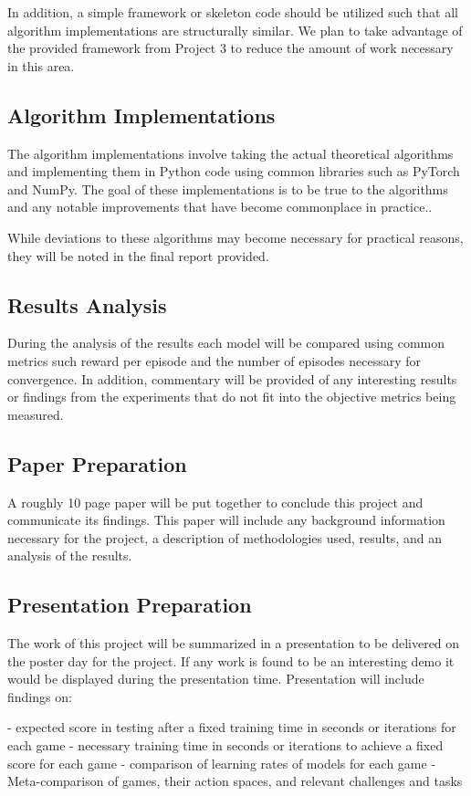 \documentclass[conference]{IEEEtran}
\begin{document}
In addition, a simple framework or skeleton code should be utilized such that all algorithm implementations are structurally similar.
We plan to take advantage of the provided framework from Project 3 to reduce the amount of work necessary in this area.

\subsection{Algorithm Implementations}
The algorithm implementations involve taking the actual theoretical algorithms and implementing them in Python code using common libraries such as PyTorch and NumPy.
The goal of these implementations is to be true to the algorithms and any notable improvements that have become commonplace in practice..

While deviations to these algorithms may become necessary for practical reasons, they will be noted in the final report provided.

\subsection{Results Analysis}
During the analysis of the results each model will be compared using common metrics such reward per episode and the number of episodes necessary for convergence.
In addition, commentary will be provided of any interesting results or findings from the experiments that do not fit into the objective metrics being measured.

\subsection{Paper Preparation}
A roughly 10 page paper will be put together to conclude this project and communicate its findings.
This paper will include any background information necessary for the project, a description of methodologies used, results, and an analysis of the results.

\subsection{Presentation Preparation}
The work of this project will be summarized in a presentation to be delivered on the poster day for the project.
If any work is found to be an interesting demo it would be displayed during the presentation time. Presentation will include findings on:
\begin{enumerate}
- expected score in testing after a fixed training time in seconds or iterations for each game
- necessary training time in seconds or iterations to achieve a fixed score for each game
- comparison of learning rates of models for each game
- Meta-comparison of games, their action spaces, and relevant challenges and tasks
\end{enumerate}
\end{document}
